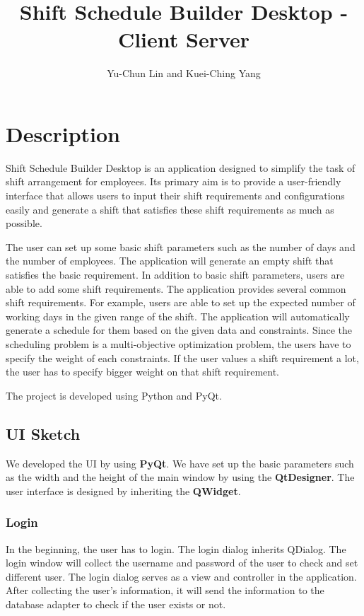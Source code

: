 \documentclass[11pt, oneside]{article}   	%
\title{Shift Schedule Builder Desktop - Client Server}
\author{Yu-Chun Lin and Kuei-Ching Yang}
\begin{document}
\maketitle
\section{Description}
Shift Schedule Builder Desktop is an application designed to simplify the task of shift arrangement for employees. Its primary aim is to provide a user-friendly interface that allows users to input their shift requirements and configurations easily and generate a shift that satisfies these shift requirements as much as possible.

The user can set up some basic shift parameters such as the number of days and the number of employees. The application will generate an empty shift that satisfies the basic requirement. In addition to basic shift parameters, users are able to add some shift requirements. The application provides several common shift requirements. For example, users are able to set up the expected number of working days in the given range of the shift. The application will automatically generate a schedule for them based on the given data and constraints. Since the scheduling problem is a multi-objective optimization problem, the users have to specify the weight of each constraints. If the user values a shift requirement a lot, the user has to specify bigger weight on that shift requirement.

The project is developed using Python and PyQt.
\subsection{UI Sketch}
We developed the UI by using \textbf{PyQt}. We have set up the basic parameters such as the width and the height of the main window by using the \textbf{QtDesigner}. The user interface is designed by inheriting the \textbf{QWidget}.

\subsubsection{Login}
In the beginning, the user has to login. The login dialog inherits QDialog. The login window will collect the username and password of the user to check and set different user. The login dialog serves as a view and controller in the application. After collecting the user's information, it will send the information to the database adapter to check if the user exists or not.
\end{document}
